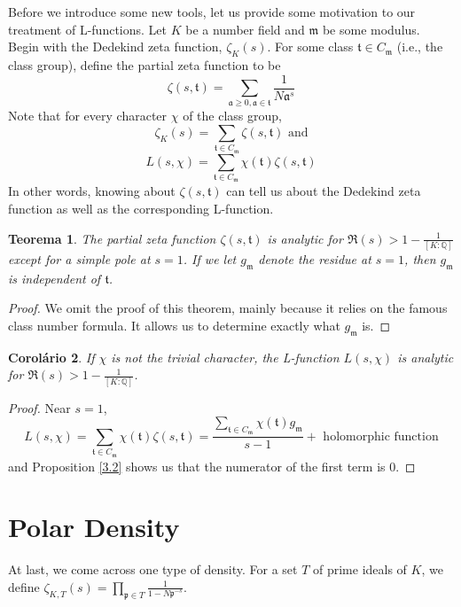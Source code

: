 \documentclass{article}
\newcommand{\QQ}{\mathbb{Q}}
\theoremstyle{plain}
\newtheorem{thm}{Teorema}
\newtheorem{cor}[thm]{Corolário}
\theoremstyle{definition}
\theoremstyle{remark}
\numberwithin{equation}{section}
\numberwithin{thm}{section}
\begin{document}
Before we introduce some new tools, let us provide some motivation to our treatment of L-functions. Let $K$ be a number field and $\mathfrak{m}$ be some modulus. Begin with the Dedekind zeta function, $\zeta_{K}(s)$. For some class $\mathfrak{t} \in C_{\mathfrak{m}}$ (i.e., the class group), define the partial zeta function to be $$\zeta(s, \mathfrak{t}) = \sum_{\mathfrak{a} \ge 0, \mathfrak{a} \in \mathfrak{t}} \frac{1}{N\mathfrak{a}^s}$$ Note that for every character $\chi$ of the class group, $$\zeta_{K}(s) = \sum_{\mathfrak{t} \in C_{\mathfrak{m}}} \zeta(s, \mathfrak{t}) \text{ and}$$ $$L(s, \chi) = \sum_{\mathfrak{t} \in C_{\mathfrak{m}}} \chi(\mathfrak{t})\zeta(s, \mathfrak{t})$$ In other words, knowing about $\zeta(s, \mathfrak{t})$ can tell us about the Dedekind zeta function as well as the corresponding L-function. 

\begin{thm}
The partial zeta function $\zeta(s, \mathfrak{t})$ is analytic for $\Re(s) > 1 - \frac{1}{[K : \QQ]}$ except for a simple pole at $s = 1$. If we let $g_{\mathfrak{m}}$ denote the residue at $s = 1$, then $g_{\mathfrak{m}}$ is independent of $\mathfrak{t}$.
\end{thm}

\begin{proof}
We omit the proof of this theorem, mainly because it relies on the famous class number formula. It allows us to determine exactly what $g_{\mathfrak{m}}$ is. 
\end{proof}

\begin{cor}
If $\chi$ is not the trivial character, the L-function $L(s, \chi)$ is analytic for $\Re(s) > 1 - \frac{1}{[K : \QQ]}$.
\end{cor}

\begin{proof}
Near $s = 1$, $$L(s, \chi) = \sum_{\mathfrak{t} \in C_{\mathfrak{m}}} \chi(\mathfrak{t})\zeta(s, \mathfrak{t}) = \frac{\sum_{\mathfrak{t} \in C_{\mathfrak{m}}} \chi(\mathfrak{t})g_{\mathfrak{m}}}{s - 1} + \text{ holomorphic function}$$ and Proposition \ref{3.2} shows us that the numerator of the first term is $0$.
\end{proof}


\section{Polar Density}

At last, we come across one type of density. For a set $T$ of prime ideals of $K$, we define $\zeta_{K, T}(s) = \prod_{\mathfrak{p} \in T} \frac{1}{1 - N\mathfrak{p}^{-s}}$. 
\end{document}
